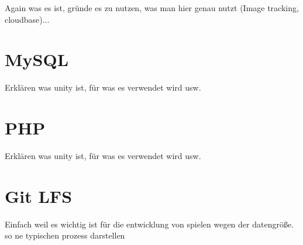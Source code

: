 Again was es ist, gründe es zu nutzen, was man hier genau nutzt (Image tracking, cloudbase)...


\section{MySQL}

Erklären was unity ist, für was es verwendet wird usw.


\section{PHP}

Erklären was unity ist, für was es verwendet wird usw.


\section{Git LFS}

Einfach weil es wichtig ist für die entwicklung von spielen wegen der datengröße. so ne typischen prozess darstellen